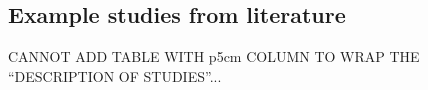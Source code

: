\subsection{Example studies from literature}

CANNOT ADD TABLE WITH p{5cm} COLUMN TO WRAP THE ``DESCRIPTION OF STUDIES''...